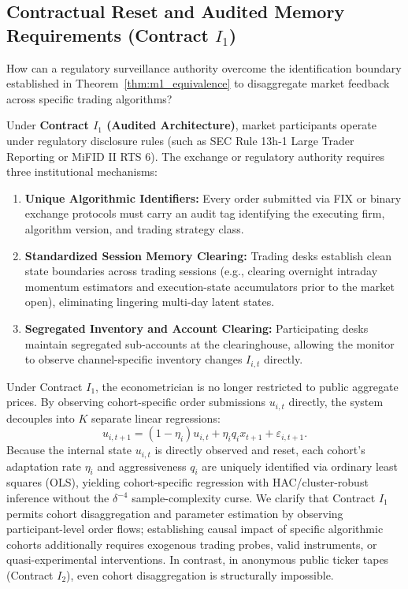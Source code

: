 \documentclass[12pt]{article}
\theoremstyle{definition}
\theoremstyle{remark}
\begin{document}
\subsection{Contractual Reset and Audited Memory Requirements \texorpdfstring{(Contract $I_1$)}{(Contract I1)}}
How can a regulatory surveillance authority overcome the identification boundary established in Theorem~\ref{thm:m1_equivalence} to disaggregate market feedback across specific trading algorithms?

Under \textbf{Contract $I_1$ (Audited Architecture)}, market participants operate under regulatory disclosure rules (such as SEC Rule 13h-1 Large Trader Reporting or MiFID II RTS 6). The exchange or regulatory authority requires three institutional mechanisms:
\begin{enumerate}[noitemsep,topsep=2pt]
    \item \textbf{Unique Algorithmic Identifiers:} Every order submitted via FIX or binary exchange protocols must carry an audit tag identifying the executing firm, algorithm version, and trading strategy class.
    \item \textbf{Standardized Session Memory Clearing:} Trading desks establish clean state boundaries across trading sessions (e.g., clearing overnight intraday momentum estimators and execution-state accumulators prior to the market open), eliminating lingering multi-day latent states.
    \item \textbf{Segregated Inventory and Account Clearing:} Participating desks maintain segregated sub-accounts at the clearinghouse, allowing the monitor to observe channel-specific inventory changes $I_{i,t}$ directly.
\end{enumerate}

Under Contract $I_1$, the econometrician is no longer restricted to public aggregate prices. By observing cohort-specific order submissions $u_{i,t}$ directly, the system decouples into $K$ separate linear regressions:
\begin{equation}
u_{i, t+1} = (1 - \eta_i) u_{i, t} + \eta_i q_i x_{t+1} + \varepsilon_{i, t+1}.
\end{equation}
Because the internal state $u_{i,t}$ is directly observed and reset, each cohort's adaptation rate $\eta_i$ and aggressiveness $q_i$ are uniquely identified via ordinary least squares (OLS), yielding cohort-specific regression with HAC/cluster-robust inference without the $\delta^{-4}$ sample-complexity curse. We clarify that Contract $I_1$ permits cohort disaggregation and parameter estimation by observing participant-level order flows; establishing causal impact of specific algorithmic cohorts additionally requires exogenous trading probes, valid instruments, or quasi-experimental interventions. In contrast, in anonymous public ticker tapes (Contract $I_2$), even cohort disaggregation is structurally impossible.
\end{document}
